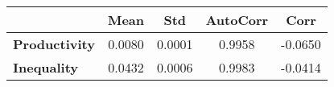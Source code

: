 \begin{tiny}\begin{tabular}{|l|c|c|c|c|}
\hline
&\textbf{Mean}&\textbf{Std}&\textbf{AutoCorr}&\textbf{Corr}\\\hline
\textbf{Productivity}&0.0080&0.0001&0.9958&-0.0650\\\hline
\textbf{Inequality}&0.0432&0.0006&0.9983&-0.0414\\\hline
\end{tabular}
\end{tiny}